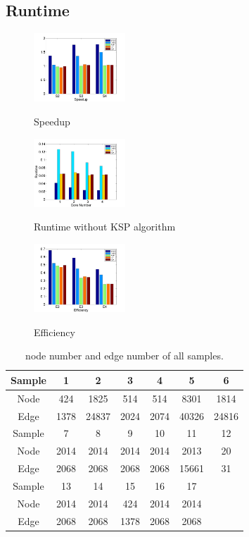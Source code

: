 \subsection{Runtime}
\begin{figure}
\centering
\includegraphics[width=1.35in]{franz/Speedup}\\
\caption{Speedup}\label{fig:Speedup}
\end{figure}
\begin{figure}
\centering
\includegraphics[width=1.35in]{franz/Runtime_NoKSP}\\
\caption{Runtime without KSP algorithm}\label{fig:Runtime_NoKSP}
\end{figure}
\begin{figure}
\centering
\includegraphics[width=1.35in]{franz/Efficiency}\\
\caption{Efficiency}\label{fig:Efficiency}
\end{figure}


\begin{table}
  \centering
  \begin{tabular}{*{7}{c}}
\toprule
Sample & 1 & 2 & 3 & 4 & 5 & 6 \\
\midrule
Node  & 424  & 1825 & 514&514 &8301 &1814   \\
Edge & 1378  & 24837 & 2024& 2074& 40326&24816  \\
\bottomrule
\toprule
Sample & 7&8&9&10&11&12 \\
\midrule
Node  &2014 & 2014&2014 & 2014& 2013&20 \\
Edge &2068 &2068 & 2068& 2068& 15661 & 31\\
\bottomrule
\toprule
Sample  &13&14&15&16&17 \\
\midrule
Node  &2014 &2014 & 424&2014 & 2014 & \\
Edge & 2068& 2068&1378 & 2068&2068& \\
\bottomrule
\end{tabular}
\caption{node number and edge number of all samples.}
\label{tab:AllSample}
\end{table}


